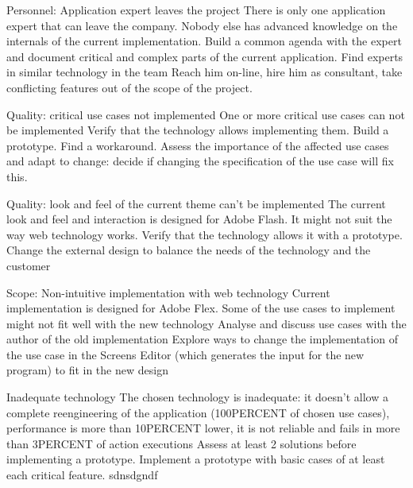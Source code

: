 \begin{risk}
{Personnel: Application expert leaves the project}
{There is only one application expert that can leave the company. Nobody else has advanced knowledge on the internals of the current implementation.}
{Build a common agenda with the expert and document critical and complex parts of the current application. Find experts in similar technology in the team}
{Reach him on-line, hire him as consultant, take conflicting features out of the scope of the project.}
\end{risk}

\begin{risk}
{Quality: critical use cases not implemented}
{One or more critical use cases can not be implemented}
{Verify that the technology allows implementing them. Build a prototype. }
{Find a workaround. Assess the importance of the affected use cases and adapt to change: decide if changing the specification of the use case will fix this.}
\end{risk}

\begin{risk}
{Quality: look and feel of the current theme can't be implemented}
{The current look and feel and interaction is designed for Adobe Flash. It might not suit the way web technology works.}
{Verify that the technology allows it with a prototype.}
{Change the external design to balance the needs of the technology and the customer}
\end{risk}

\begin{risk}
{Scope: Non-intuitive implementation with web technology}
{Current implementation is designed for Adobe Flex. Some of the use cases to implement might not fit well with the new technology}
{Analyse and discuss use cases with the author of the old implementation}
{Explore ways to change the implementation of the use case in the Screens Editor (which generates the input for the new program) to fit in the new design}
\end{risk}

\begin{risk}
{Inadequate technology}
{The chosen technology is inadequate: it doesn't allow a complete reengineering of the application (100PERCENT of chosen use cases), performance is more than 10PERCENT lower, it is not reliable and fails in more than 3PERCENT of action executions}
{Assess at least 2 solutions before implementing a prototype. Implement a prototype with basic cases of at least each critical feature.}
{sdnsdgndf}
\end{risk}


